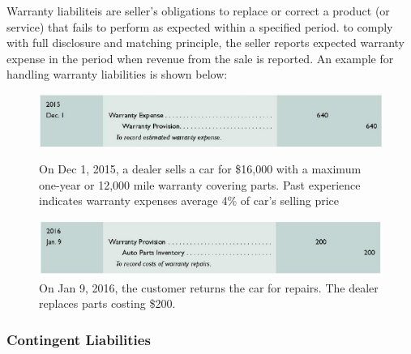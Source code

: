 \documentclass[../main.tex]{subfiles}
\begin{document}
	Warranty liabiliteis are seller's obligations to replace or correct a 
	product (or service) that fails to perform as expected within a specified 
	period. to comply with full disclosure and matching principle, the seller 
	reports expected warranty expense in the period when revenue from the sale 
	is reported. An example for handling warranty liabilities is shown below:
	\begin{figure}[ht]
		\centering
		\includegraphics[width=1\columnwidth]{images/c10_warranty1.png}
		\caption{On Dec 1, 2015, a dealer sells a car for \$16,000 with a 
			maximum one-year or 12,000 mile warranty covering parts. Past 
			experience indicates warranty expenses average 4\% of car's selling 
			price}
		\includegraphics[width=1\columnwidth]{images/c10_warranty2.png}
		\caption{On Jan 9, 2016, the customer returns the car for repairs. The 
			dealer replaces parts costing \$200.}
	\end{figure}	
	
	\subsubsection{Contingent Liabilities}
	
\end{document}
